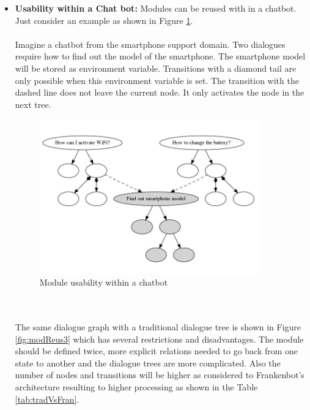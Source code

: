 \begin{itemize}
\item \textbf{Usability within a Chat bot:} Modules can be reused with in a chatbot. Just consider an example as shown in Figure \ref{fig:modReus2}. 
\\~\\
Imagine a chatbot from the smartphone support domain. Two dialogues require how to find out the model of the smartphone. The smartphone model will be stored as environment variable. Transitions with a diamond tail are only possible when this environment variable is set. The transition with the dashed line does not leave the current node. It only activates the node in the next tree.
\begin{figure}[!h]
    \centering
    \includegraphics[width=0.9\textwidth]{img/Module_Reusability_2.PNG}
    \caption{Module usability within a chatbot}
    \label{fig:modReus2}
\end{figure} 
\\~\\
The same dialogue graph with a traditional dialogue tree is shown in Figure \ref{fig:modReus3} which has several restrictions and disadvantages. The module should be defined twice, more explicit relations needed to go back from one state to another and the dialogue trees are more complicated. Also the number of nodes and transitions will be higher as considered to Frankenbot's architecture resulting to higher processing as shown in the Table \ref{tab:tradVsFran}.
\begin{figure}[!h]
    \centering

\end{figure}
\end{itemize}
